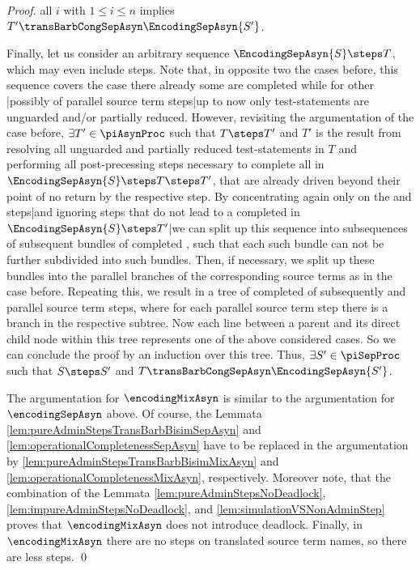 \documentclass[]{llncs}
\begin{document}
\begin{proof}
all $ i $ with $ 1 \leq i \leq n $ implies $ T' \transBarbCongSepAsyn \EncodingSepAsyn{S'} $.
	
	Finally, let us consider an arbitrary sequence $ \EncodingSepAsyn{S} \steps T $, which may even include \nonAdmin steps. Note that, in opposite two the cases before, this sequence covers the case there already some \simulations are completed while for other \simulations\!\!|possibly of parallel source term steps|up to now only test-statements are unguarded and/or partially reduced. However, revisiting the argumentation of the case before, $ \exists T' \in \piAsynProc $ such that $ T \steps T' $ and $ T' $ is the result from resolving all unguarded and partially reduced test-statements in $ T $ and performing all post-precessing steps necessary to complete all \simulations in $ \EncodingSepAsyn{S} \steps T \steps T' $, that are already driven beyond their point of no return by the respective \nonAdmin step. By concentrating again only on the \impure \admin and \nonAdmin steps|and ignoring \impure \admin steps that do not lead to a completed \simulation in $ \EncodingSepAsyn{S} \steps T' $|we can split up this sequence into subsequences of subsequent bundles of completed \simulations, such that each such bundle can not be further subdivided into such bundles. Then, if necessary, we split up these bundles into the parallel branches of the corresponding source terms as in the case before. Repeating this, we result in a tree of completed \simulation of subsequently and parallel source term steps, where for each parallel source term step there is a branch in the respective subtree. Now each line between a parent and its direct child node within this tree represents one of the above considered cases. So we can conclude the proof by an induction over this tree. Thus, $ \exists S' \in \piSepProc $ such that $ S \steps S' $ and $ T \transBarbCongSepAsyn \EncodingSepAsyn{S'} $.
	
	\vspace*{1em}
	\noindent The argumentation for $ \encodingMixAsyn $ is similar to the argumentation for $ \encodingSepAsyn $ above. Of course, the Lemmata \ref{lem:pureAdminStepsTransBarbBisimSepAsyn} and \ref{lem:operationalCompletenessSepAsyn} have to be replaced in the argumentation by \ref{lem:pureAdminStepsTransBarbBisimMixAsyn} and \ref{lem:operationalCompletenessMixAsyn}, respectively. Moreover note, that the combination of the Lemmata \ref{lem:pureAdminStepsNoDeadlock}, \ref{lem:impureAdminStepsNoDeadlock}, and \ref{lem:simulationVSNonAdminStep} proves that $ \encodingMixAsyn $ does not introduce deadlock. Finally, in $ \encodingMixAsyn $ there are no steps on translated source term names, so there are less \impure \admin steps.
	\qed
\end{proof}
\end{document}
